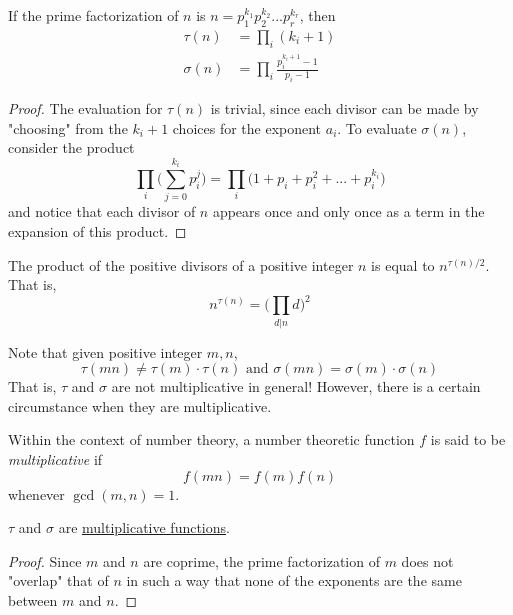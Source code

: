 \documentclass{article}
\newcounter{theorem}[section]
\newcounter{definition}[section]
\begin{document}
\begin{corollary}
  \label{thm:closed-forms-for-tau-and-sigma}
If the prime factorization of $n$ is $n = p_1^{k_1} p_2^{k_2} ... p_r^{k_r}$, then
\begin{align*}
    \tau(n) & = \prod_i (k_i + 1) \\
    \sigma(n) & = \prod_i \frac{p_i^{k_i + 1} - 1}{p_i - 1}
\end{align*}
\end{corollary}
\begin{proof}
The evaluation for $\tau(n)$ is trivial, since each divisor can be made by "choosing" from the $k_i + 1$ choices for the exponent $a_i$. To evaluate $\sigma(n)$, consider the product 
\begin{equation}
  \prod_i \Big( \sum_{j=0}^{k_i} p_i^j \Big) = \prod_{i} \big(1 + p_i + p_i^2 + ... + p_i^{k_i}\big)
\end{equation}
and notice that each divisor of $n$ appears once and only once as a term in the expansion of this product. 
\end{proof}

\begin{theorem}
  \label{thm:product-of-the-positive-divisors}
The product of the positive divisors of a positive integer $n$ is equal to $n^{\tau(n)/2}$. That is, 
\begin{equation}
  n^{\tau(n)} = \bigg( \prod_{d|n} d \bigg)^2
\end{equation}
\end{theorem}

Note that given positive integer $m, n$, 
\begin{equation}
  \tau(m n) \neq \tau(m) \cdot \tau(n) \text{ and } \sigma(m n) = \sigma(m) \cdot \sigma(n)
\end{equation}
That is, $\tau$ and $\sigma$ are not multiplicative in general! However, there is a certain circumstance when they are multiplicative. 

\begin{definition}
  \label{def:multiplicative-function}
Within the context of number theory, a number theoretic function $f$ is said to be \textit{multiplicative} if 
\begin{equation}
  f(m n) = f(m) f(n)
\end{equation}
whenever $\gcd(m, n) = 1$. 
\end{definition}

\begin{theorem}
  \label{thm:tau-and-sigma-are-multiplicative}
$\tau$ and $\sigma$ are \hyperref[def:multiplicative-function]{multiplicative functions}. 
\end{theorem}
\begin{proof}
Since $m$ and $n$ are coprime, the prime factorization of $m$ does not "overlap" that of $n$ in such a way that none of the exponents are the same between $m$ and $n$. 
\end{proof}
\end{document}

